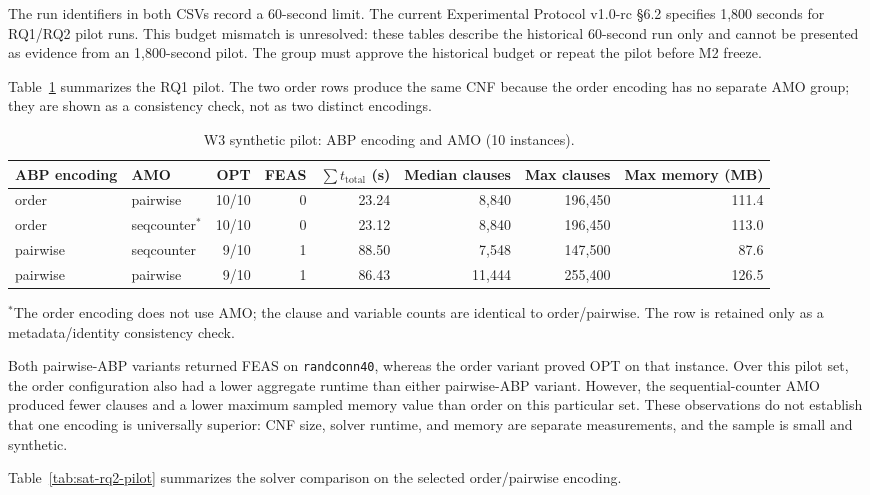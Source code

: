 The run identifiers in both CSVs record a 60-second limit. The current
Experimental Protocol v1.0-rc §6.2 specifies 1,800 seconds for RQ1/RQ2 pilot
runs. This budget mismatch is unresolved: these tables describe the historical
60-second run only and cannot be presented as evidence from an 1,800-second
pilot. The group must approve the historical budget or repeat the pilot before
M2 freeze.

Table~\ref{tab:sat-rq1-pilot} summarizes the RQ1 pilot. The two order rows
produce the same CNF because the order encoding has no separate AMO group;
they are shown as a consistency check, not as two distinct encodings.

\begin{table}[t]
\centering
\caption{W3 synthetic pilot: ABP encoding and AMO (10 instances).}
\label{tab:sat-rq1-pilot}
\begin{tabular}{llrrrrrr}
\hline
ABP encoding & AMO & OPT & FEAS & $\sum t_{\mathrm{total}}$ (s) &
Median clauses & Max clauses & Max memory (MB)\\
\hline
order & pairwise & 10/10 & 0 & 23.24 & 8,840 & 196,450 & 111.4\\
order & seqcounter$^\ast$ & 10/10 & 0 & 23.12 & 8,840 & 196,450 & 113.0\\
pairwise & seqcounter & 9/10 & 1 & 88.50 & 7,548 & 147,500 & 87.6\\
pairwise & pairwise & 9/10 & 1 & 86.43 & 11,444 & 255,400 & 126.5\\
\hline
\end{tabular}
\par\smallskip
\footnotesize $^\ast$The order encoding does not use AMO; the clause and
variable counts are identical to order/pairwise. The row is retained only as
a metadata/identity consistency check.
\end{table}

Both pairwise-ABP variants returned FEAS on \texttt{randconn40}, whereas the
order variant proved OPT on that instance. Over this pilot set, the order
configuration also had a lower aggregate runtime than either pairwise-ABP
variant. However, the sequential-counter AMO produced fewer clauses and a
lower maximum sampled memory value than order on this particular set. These
observations do not establish that one encoding is universally superior:
CNF size, solver runtime, and memory are separate measurements, and the
sample is small and synthetic.

Table~\ref{tab:sat-rq2-pilot} summarizes the solver comparison on the selected
order/pairwise encoding.

